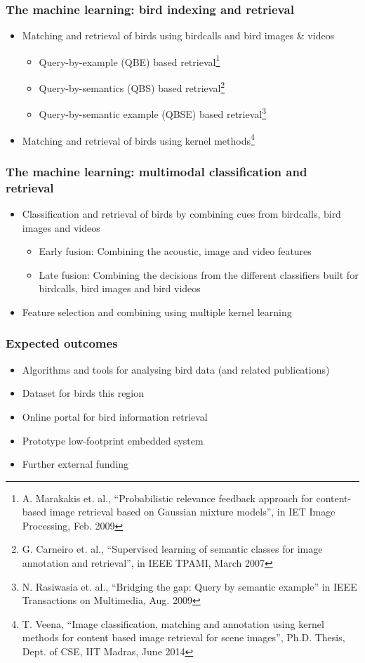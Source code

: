 \documentclass[mathserif]{beamer}
\begin{document}
\begin{frame}
\frametitle{The machine learning: bird indexing and retrieval}
\begin{itemize}
\item<2-> Matching and retrieval of birds using birdcalls and bird images \& videos
\begin{itemize}
      \item Query-by-example (QBE) based retrieval\footnote{
	A. Marakakis et. al., ``Probabilistic relevance feedback approach for content-based image retrieval based on Gaussian mixture models'', in IET Image Processing, Feb. 2009}
      \item Query-by-semantics (QBS) based retrieval\footnote{
	G. Carneiro et. al., ``Supervised learning of semantic classes for image annotation and retrieval'', in IEEE TPAMI, March 2007}
      \item Query-by-semantic example (QBSE) based retrieval\footnote{
	N. Rasiwasia et. al., ``Bridging the gap: Query by semantic example'' in IEEE Transactions on Multimedia, Aug. 2009}
\end{itemize}
\item<3-> Matching and retrieval of birds using kernel methods\footnote{
	T. Veena, ``Image classification, matching and annotation using kernel methods for content based image retrieval for scene images'', Ph.D. Thesis, Dept. of CSE, IIT Madras, June 2014}   
\end{itemize}
\end{frame}

\begin{frame}
\frametitle{The machine learning: multimodal classification and retrieval}
\begin{itemize}
\item<2-> Classification and retrieval of birds by combining cues from
birdcalls, bird images and videos
\begin{itemize}
      \item Early fusion: Combining the acoustic, image and video features
      \item Late fusion: Combining the decisions from the different classifiers built for birdcalls, bird images and bird videos
 \end{itemize}
\item<3-> Feature selection and combining using multiple kernel learning
\end{itemize}
\end{frame}

\begin{frame}
\frametitle{Expected outcomes}
\begin{itemize}
\item Algorithms and tools for analysing bird data (and related publications)
\item Dataset for birds this region
\item Online portal for bird information retrieval
\item Prototype low-footprint embedded system
\item Further external funding
\end{itemize}
\end{frame}
\end{document}

